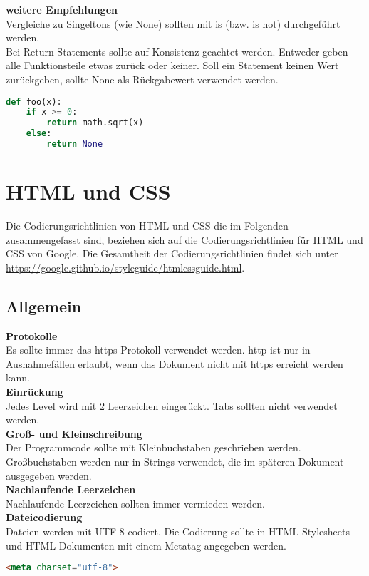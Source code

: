 \textbf{weitere Empfehlungen}\\
Vergleiche zu Singeltons (wie None) sollten mit is (bzw. is not) durchgeführt werden.\\
Bei Return-Statements sollte auf Konsistenz geachtet werden. Entweder geben alle Funktionsteile etwas zurück oder keiner. Soll ein Statement keinen Wert zurückgeben, sollte None als Rückgabewert verwendet werden.
\begin{lstlisting}[language = Python, caption = konsistente return-Statements, label = lst:return-Statements]
def foo(x):
	if x >= 0:
		return math.sqrt(x)
	else:
		return None
\end{lstlisting}

\section{HTML und CSS}
Die Codierungsrichtlinien von HTML und CSS die im Folgenden zusammengefasst sind, beziehen sich auf die Codierungsrichtlinien für HTML und CSS von Google. Die Gesamtheit der Codierungsrichtlinien findet sich unter \url{https://google.github.io/styleguide/htmlcssguide.html}.
\subsection{Allgemein}
\textbf{Protokolle}\\
Es sollte immer das https-Protokoll verwendet werden. http ist nur in Ausnahmefällen erlaubt, wenn das Dokument nicht mit https erreicht werden kann.\\

\textbf{Einrückung}\\
Jedes Level wird mit 2 Leerzeichen eingerückt. Tabs sollten nicht verwendet werden.\\

\textbf{Groß- und Kleinschreibung}\\
Der Programmcode sollte mit Kleinbuchstaben geschrieben werden. Großbuchstaben werden nur in Strings verwendet, die im späteren Dokument ausgegeben werden.\\

\textbf{Nachlaufende Leerzeichen}\\
Nachlaufende Leerzeichen sollten immer vermieden werden.\\

\textbf{Dateicodierung}\\
Dateien werden mit UTF-8 codiert.
Die Codierung sollte in HTML Stylesheets und HTML-Dokumenten mit einem Metatag angegeben werden.\\
\begin{lstlisting}[language = HTML, caption = Metatag für die UTF-8 Codierung, label = utf-8]
<meta charset="utf-8">
\end{lstlisting}

